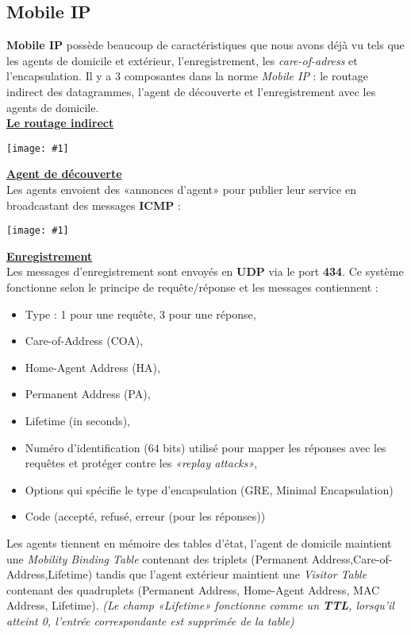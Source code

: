 \documentclass{article}
\newcommand{\imgR}[2]{\begin{center}\texttt{[image: \#1]}\end{center}}
\newcommand{\stitre}[1]{\noindent\textbf{\underline{#1}} \\}
\begin{document}
\subsection{Mobile IP}

\textbf{Mobile IP} possède beaucoup de caractéristiques que nous avons déjà vu tels que les agents de domicile et 
extérieur, l'enregistrement, les \textit{care-of-adress} et l'encapsulation. Il y a 3 composantes dans la norme 
\textit{Mobile IP} : le routage indirect des datagrammes, l'agent de découverte et l'enregistrement avec les 
agents de domicile. \\

\stitre{Le routage indirect}

\imgR{CN_165.png}{300}

\newpage
\stitre{Agent de découverte}

\noindent Les agents envoient des «annonces d'agent» pour publier leur service en broadcastant des messages 
\textbf{ICMP} : \imgR{CN_166.png}{300}

\stitre{Enregistrement}

\noindent Les messages d'enregistrement sont envoyés en \textbf{UDP} via le port \textbf{434}. Ce système 
fonctionne selon le principe de requête/réponse et les messages contiennent : 
\begin{itemize}
\item Type : 1 pour une requête, 3 pour une réponse,
\item Care-of-Address (COA),
\item Home-Agent Address (HA),
\item Permanent Address (PA),
\item Lifetime (in seconds),
\item Numéro d'identification ($64$ bits) utilisé pour mapper les réponses avec les requêtes et protéger contre 
les \textit{«replay attacks»},
\item Options qui spécifie le type d'encapsulation (GRE, Minimal Encapsulation)
\item Code (accepté, refusé, erreur (pour les réponses))
\end{itemize}

Les agents tiennent en mémoire des tables d'état, l'agent de domicile maintient une \textit{Mobility Binding 
Table} contenant des triplets (Permanent Address,Care-of-Address,Lifetime) tandis que l'agent extérieur maintient 
une \textit{Visitor Table} contenant des quadruplets (Permanent Address, Home-Agent Address, MAC Address, 
Lifetime). \textit{(Le champ «Lifetime» fonctionne comme un \textbf{TTL}, lorsqu'il atteint 0, l'entrée 
correspondante est supprimée de la table)}
\end{document}
